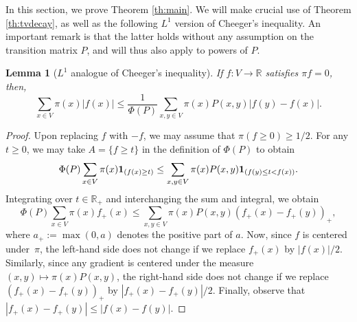 \documentclass[JEP,XML,SOM,Unicode,NoEqCountersInSection,published]{cedram}
\newtheorem{lemma}{Lemma}
\theoremstyle{definition}
\newcommand{\dR}{\mathbb {R}}
\begin{document}
In this section, we prove Theorem \ref{th:main}.
We will make crucial use of Theorem \ref{th:tvdecay}, as well as the following $L^1$ version of Cheeger's inequality. An important remark is that the latter holds without any assumption on the transition matrix $P$, and will thus also apply to powers of $P$.
\begin{lemma}[$L^1$ analogue of Cheeger's inequality]\label{lm:L1} If $f\colon V\to\dR$ satisfies $\pi f=0$, then,
\begin{equation*}
\sum_{x\in V}\pi(x)\left|f(x)\right| \le \frac{1}{\Phi(P)}\sum_{x,y\in V}\pi(x)P(x,y)\left|f(y)-f(x)\right|.
\end{equation*}
\end{lemma}
\begin{proof} Upon replacing $f$ with $-f$, we may assume that $\pi(f\ge 0)\ge 1/2$. For any $t\ge 0$, we may take $A=\{f\ge t\}$ in the definition of $\Phi(P)$ to obtain
\begin{equation*}
\Phi(P) \sum_{x\in V}\pi(x){\bf 1}_{(f(x)\ge t)} \le \sum_{x,y\in V}\pi(x)P(x,y){\bf 1}_{(f(y)\le t<f(x))}.
\end{equation*}
Integrating over $t\in\dR_+$ and interchanging the sum and integral, we obtain
\begin{equation*}
\Phi(P)\sum_{x\in V}\pi(x)f_+(x) \le \sum_{x,y\in V}\pi(x)P(x,y)(f_+(x)-f_+(y))_+,
\end{equation*}
where $a_+:=\max(0,a)$ denotes the positive part of $a$. Now, since $f$ is centered under~$\pi$, the left-hand side does not change if we replace $f_+(x)$ by $|f(x)|/2$. Similarly, since any gradient is centered under the measure $(x,y)\mapsto \pi(x)P(x,y)$, the right-hand side does not change if we replace $\left(f_+(x)-f_+(y)\right)_+$ by $\left|f_+(x)-f_+(y)\right|/2$. Finally, observe that $\left|f_+(x)-f_+(y)\right| \le|f(x)-f(y)|$.
\end{proof}
\end{document}
